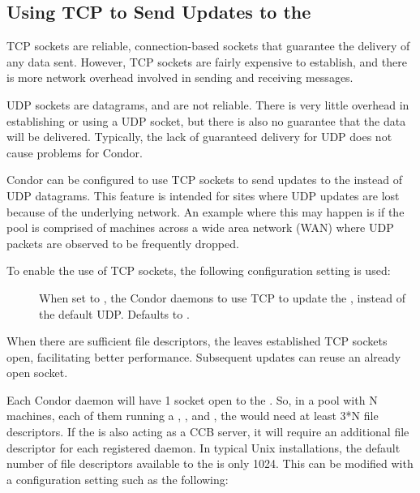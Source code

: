 \subsection{\label{sec:tcp-collector-update}Using TCP to Send Updates to
the }


TCP sockets are reliable, connection-based sockets that guarantee
the delivery of any data sent.
However, TCP sockets are fairly expensive to establish, and there is more
network overhead involved in sending and receiving messages.

UDP sockets are datagrams, and are not reliable.
There is very little overhead in establishing or using a UDP socket,
but there is also no guarantee that the data will be delivered.
Typically, the lack of guaranteed delivery for UDP does not cause
problems for Condor.

Condor can be configured to use TCP
sockets to send updates to the  instead of
UDP datagrams.
This feature is intended for sites where UDP updates are
lost because of the underlying network.
An example where this may happen is if the pool is comprised of
machines across a wide area network (WAN) where UDP packets are
observed to be frequently dropped.

To enable the use of TCP sockets, the following configuration
setting is used:

\begin{description}

\item[]
  When set to , the Condor daemons to use TCP to
  update the , instead of the default UDP.
  Defaults to .

\end{description}

When there are sufficient file descriptors, the  leaves
established TCP sockets open, facilitating better performance.
Subsequent updates can reuse an already open socket.

Each Condor daemon will have 1 socket open to the .
So, in a pool with N machines, each of them running a ,
, and , the  would
need at least 3*N file descriptors.  If the  is also
acting as a CCB server, it will require an additional file descriptor for
each registered daemon.  In typical Unix installations,
the default number of file descriptors available to the 
 is only 1024.
  This can be modified with a configuration setting such as the following:

